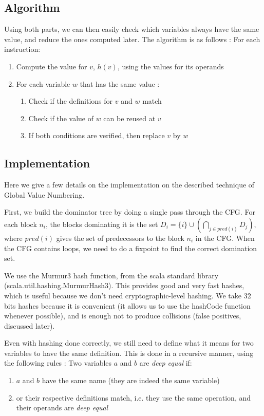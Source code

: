 \documentclass[11pt,a4paper]{article}
\newcommand{\scala}[1]{\textsf{#1}}
\begin{document}
\subsection{Algorithm}

Using both parts, we can then easily check which variables always have the same value, and reduce the ones computed later. The algorithm is as follows : \newline
For each instruction:
\begin{enumerate}
\item Compute the value for $v$, $h(v)$, using the values for its operands
\item For each variable $w$ that has the same value :
	\begin{enumerate}
	\item Check if the definitions for $v$ and $w$ match
	\item Check if the value of $w$ can be reused at $v$
	\item If both conditions are verified, then replace $v$ by $w$
	\end{enumerate}
\end{enumerate}

\subsection{Implementation}

Here we give a few details on the implementation on the described technique of Global Value Numbering.

First, we build the dominator tree by doing a single pass through the CFG. For each block $n_i$, the blocks dominating it is the set $D_i = \{i\} \cup \left( \bigcap\limits_{j \in pred(i)} D_j \right)$, where $pred(i)$ gives the set of predecessors to the block $n_i$ in the CFG. When the CFG contains loops, we need to do a fixpoint to find the correct domination set.

We use the \textsf{Murmur3} hash function, from the scala standard library (\scala{scala.util.hashing.MurmurHash3}). This provides good and very fast hashes, which is useful because we don't need cryptographic-level hashing. We take 32 bits hashes because it is convenient (it allows us to use the \scala{hashCode} function whenever possible), and is enough not to produce collisions (false positives, discussed later).

Even with hashing done correctly, we still need to define what it means for two variables to have the same definition. This is done in a recursive manner, using the following rules :
\newline
Two variables $a$ and $b$ are \textit{deep equal} if:
\begin{enumerate}
\item $a$ and $b$ have the same name (they are indeed the same variable)
\item or their respective definitions match, i.e. they use the same operation, and their operands are \textit{deep equal}
\end{enumerate}
\end{document}
